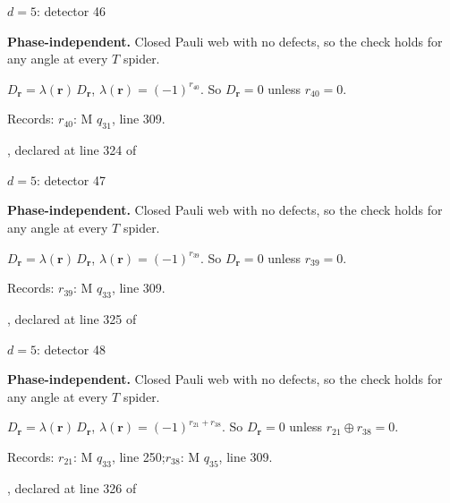 \label{d5_det046}
{\Large $d=5$: detector 46}\par
\textbf{Phase-independent.} Closed Pauli web with no defects, so the check holds for any angle at every $T$ spider.
\begin{center}
\end{center}
\vspace{-1mm}
$D_{\boldsymbol r}=\lambda(\boldsymbol r)\,D_{\boldsymbol r}$, \quad $\lambda(\boldsymbol r)=(-1)^{r_{40}}$. \qquad So $D_{\boldsymbol r}=0$ unless $r_{40}=0$.
\par\smallskip\begin{minipage}{.98\linewidth}\small Records: $r_{40}$: M $q_{31}$, line 309.\end{minipage}
\vfill
{\footnotesize\texttt{}, declared at line 324 of \texttt{}}
\newpage

\label{d5_det047}
{\Large $d=5$: detector 47}\par
\textbf{Phase-independent.} Closed Pauli web with no defects, so the check holds for any angle at every $T$ spider.
\begin{center}
\end{center}
\vspace{-1mm}
$D_{\boldsymbol r}=\lambda(\boldsymbol r)\,D_{\boldsymbol r}$, \quad $\lambda(\boldsymbol r)=(-1)^{r_{39}}$. \qquad So $D_{\boldsymbol r}=0$ unless $r_{39}=0$.
\par\smallskip\begin{minipage}{.98\linewidth}\small Records: $r_{39}$: M $q_{33}$, line 309.\end{minipage}
\vfill
{\footnotesize\texttt{}, declared at line 325 of \texttt{}}
\newpage

\label{d5_det048}
{\Large $d=5$: detector 48}\par
\textbf{Phase-independent.} Closed Pauli web with no defects, so the check holds for any angle at every $T$ spider.
\begin{center}
\end{center}
\vspace{-1mm}
$D_{\boldsymbol r}=\lambda(\boldsymbol r)\,D_{\boldsymbol r}$, \quad $\lambda(\boldsymbol r)=(-1)^{r_{21}+r_{38}}$. \qquad So $D_{\boldsymbol r}=0$ unless $r_{21}\oplus r_{38}=0$.
\par\smallskip\begin{minipage}{.98\linewidth}\small Records: $r_{21}$: M $q_{33}$, line 250;\quad $r_{38}$: M $q_{35}$, line 309.\end{minipage}
\vfill
{\footnotesize\texttt{}, declared at line 326 of \texttt{}}
\newpage

